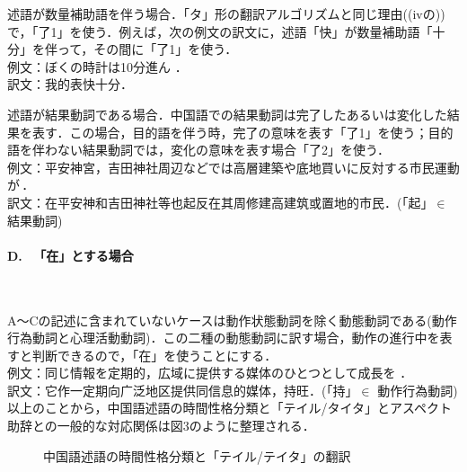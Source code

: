 \begin{enumerater}
\renewcommand{\labelenumi}{}
\renewcommand{\theenumi}{}
\item 述語が数量補助語を伴う場合．「タ」形の翻訳アルゴリズムと同じ理由((ivの))で，「了1」を使う．例えば，次の例文の訳文に，述語「快」が数量補助語「十分」を伴って，その間に「了1」を使う．\\例文：ぼくの時計は10分進ん ．\\訳文：我的表快十分．
\item 述語が結果動詞である場合．中国語での結果動詞は完了したあるいは変化した結果を表す．この場合，目的語を伴う時，完了の意味を表す「了1」を使う；目的語を伴わない結果動詞では，変化の意味を表す場合「了2」を使う．\\例文：平安神宮，吉田神社周辺などでは高層建築や底地買いに反対する市民運動が\,．\\訳文：在平安神和吉田神社等也起反在其周修建高建筑或置地的市民．(「起」$\in$ 結果動詞)
\end{enumerater}

\paragraph{D. 　「在」とする場合}　

A〜Cの記述に含まれていないケースは動作状態動詞を除く動態動詞である(動作行為動詞と心理活動動詞)．この二種の動態動詞に訳す場合，動作の進行中を表すと判断できるので，「在」を使うことにする．\\例文：同じ情報を定期的，広域に提供する媒体のひとつとして成長を ．\\訳文：它作一定期向广泛地区提供同信息的媒体，持旺．(「持」$\in$ 動作行為動詞)\\

以上のことから，中国語述語の時間性格分類と「テイル/タイタ」とアスペクト助辞との一般的な対応関係は図3のように整理される．

\begin{figure}[hbtp]
\begin{center}
\caption{中国語述語の時間性格分類と「テイル/テイタ」の翻訳}
\label{fig:3}
\end{center}
\end{figure}


